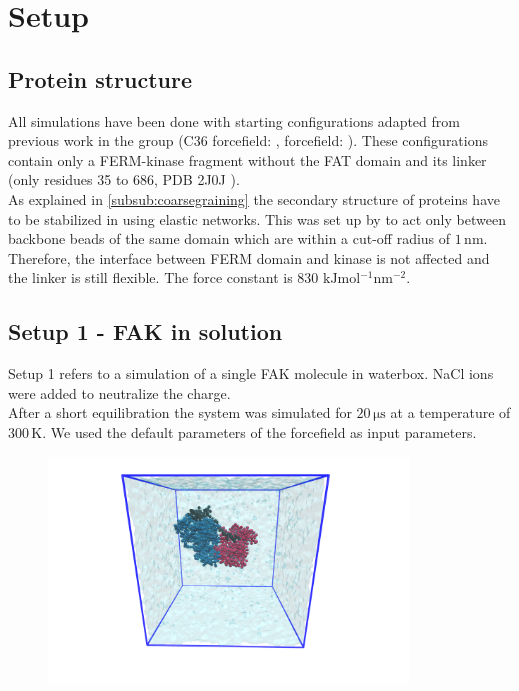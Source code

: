 \chapter{Setup}
\section{Protein structure}
All simulations have been done with starting configurations adapted from previous work in the group (C36 forcefield: \textcite{pap003}, \martini{} forcefield: \textcite{sara}). These configurations contain only a FERM-kinase fragment without the FAT domain and its linker (only residues 35 to 686, PDB 2J0J \autocite{structFAK}).\\
As explained in \autoref{subsub:coarsegraining} the secondary structure of proteins have to be stabilized in \martini{} using elastic networks. This was set up by \textcite{sara} to act only between backbone beads of the same domain which are within a cut-off radius of $1\,\si{\nano\metre}$. Therefore, the interface between FERM domain and kinase is not affected and the linker is still flexible. The force constant is 830 $\si{\kilo\joule\mole^{-1}\nano\meter^{-2}}$. 
\section{Setup 1 - FAK in solution}
\label{setup:setup1}
Setup 1 refers to a \martini{} simulation of a single FAK molecule in waterbox. NaCl ions were added to neutralize the charge.\\
After a short equilibration the system was simulated for $20\,\si{\micro\second}$ at a temperature of $300\,\si{\kelvin}$. We used the default parameters of the \martini{} forcefield as input parameters.
%
%
%
\begin{figure}[h]
	\centering
	\includegraphics[height=6cm]{figures/setup/setup_free}
	\label{setup:setup1_pic}
\end{figure}
%
%
%
